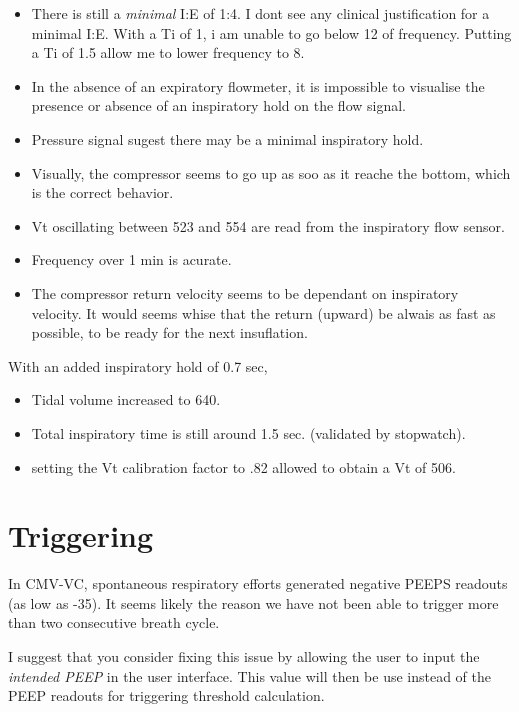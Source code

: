 \documentclass{nrepport}
\begin{document}
\begin{itemize}
\item There is still a \emph{minimal} I:E of 1:4. I dont see any
clinical justification for a minimal I:E. With a Ti of 1, i am unable
to go below 12 of frequency. Putting a Ti of 1.5 allow me to lower
frequency to 8.

\item In the absence of an expiratory flowmeter, it is impossible to
	visualise the presence or absence of an inspiratory hold on the flow
	signal.
\item Pressure signal sugest there may be a minimal inspiratory
	hold.
\item Visually, the compressor seems to go up as soo as it reache
	the bottom, which is the correct behavior.

\item Vt oscillating between 523 and 554 are read from the
	inspiratory flow sensor.

\item Frequency over 1 min is acurate.

\item The compressor return velocity seems to be dependant on
	inspiratory velocity. It would seems whise that the return (upward)
		be alwais as fast as possible, to be ready for the next
		insuflation.
\end{itemize}

With an added inspiratory hold of 0.7 sec,

\begin{itemize}
	\item Tidal volume increased to 640.
	\item Total inspiratory time is still around 1.5 sec. (validated by
		stopwatch).
	\item setting the Vt calibration factor to .82 allowed to obtain a
		Vt of 506.
\end{itemize}

\section{Triggering}

In CMV-VC, spontaneous respiratory efforts generated negative PEEPS
readouts (as low as -35). It seems likely the reason we have not been
able to trigger more than two consecutive breath cycle.

I suggest that you consider fixing this issue by allowing the user to
input the	\emph{intended PEEP} in the user interface.	This value will
then be use instead of the PEEP readouts for triggering threshold
calculation.
\end{document}
